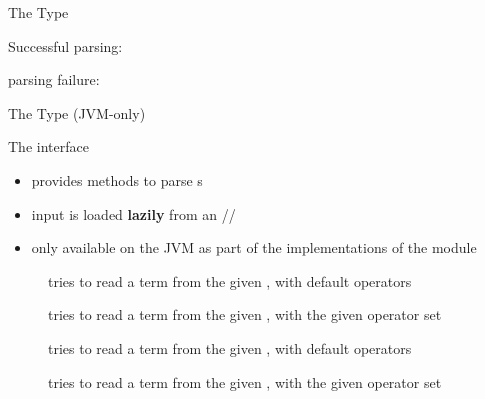 \documentclass[handout]{beamer}
\begin{document}
\begin{frame}[allowframebreaks]{The  Type}
    \framebreak

    Successful  parsing:

    \framebreak

     parsing failure:

\end{frame}

\begin{frame}[allowframebreaks]{The  Type (JVM-only)}
    \begin{block}{The  interface}
        \begin{itemize}
            \item provides methods to parse s
            \item input is loaded \textbf{lazily} from an //
            \item only available on the JVM as part of the  implementations of the  module
        \end{itemize}
    \end{block}
    \begin{description}
        \item [] tries to read a term from the given , with default operators
        \item [] tries to read a term from the given , with the given operator set
        \item [] tries to read a term from the given , with default operators
        \item [] tries to read a term from the given , with the given operator set
    \end{description}

    \framebreak


\end{frame}
\end{document}
